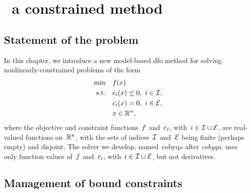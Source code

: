 %
%
%
\chapter{ \textemdash\ a constrained  method}
\label{ch:cobyqa-introduction}

\section{Statement of the problem}

In this chapter, we introduce a new model-based \gls{dfo} method for solving nonlinearly-constrained problems of the form
\begin{subequations}
    \label{eq:problem-cobyqa}
    \begin{align}
        \min        & \quad f(x) \label{eq:problem-cobyqa-obj}\\
        \text{s.t.} & \quad c_{i}(x) \le 0, ~ i \in \mathcal{I}, \label{eq:problem-cobyqa-ub}\\
                    & \quad c_{i}(x) = 0, ~ i \in \mathcal{E},\\
                    & \quad x \in \mathbb{R}^n, \nonumber
    \end{align}
\end{subequations}
where the objective and constraint functions~$f$ and~$c_{i}$, with~$i \in \mathcal{I} \cup \mathcal{E}$, are real-valued functions on~$\mathbb{R}^n$, with the sets of indices~$\mathcal{I}$ and~$\mathcal{E}$ being finite (perhaps empty) and disjoint.
The solver we develop, named~\gls{cobyqa} after \emph{\glsdesc{cobyqa}}, uses only function values of~$f$ and~$c_{i}$, with~$i \in \mathcal{I} \cup \mathcal{E}$, but not derivatives.

\section{Management of bound constraints}


